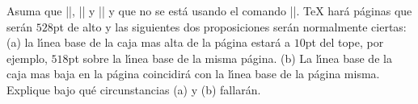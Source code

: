 


\bigskip

\enunciadoS Asuma que |\vsize=528pt|, |\maxdepth=2.2pt| y
|\topskip=10pt| y que no se est\'a usando el comando |\insert|. {\TeX}
har\'a p\'aginas que ser\'an $528$pt de alto y las siguientes dos
proposiciones ser\'an normalmente ciertas: (a) la l\'{\i}nea base de
la caja mas alta de la p\'agina estar\'a a $10$pt del tope, por
ejemplo, $518$pt sobre la l\'{\i}nea base de la misma p\'agina. (b) La
l\'{\i}nea base de la caja mas baja en la p\'agina coincidir\'a con la
l\'{\i}nea base de la p\'agina misma. Explique bajo qu\'e
circunstancias (a) y (b) fallar\'an.

\bigskip


\bye

